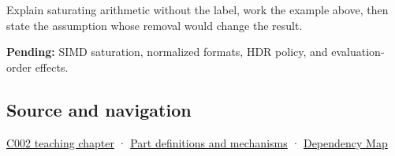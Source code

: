 Explain saturating arithmetic without the label, work the example above, then state the assumption whose removal would change the result.

\textbf{Pending:} SIMD saturation, normalized formats, HDR policy, and evaluation-order effects.

\subsection{Source and navigation}\label{appendix-3999c6209649-source-and-navigation}

\hyperref[01-foundations-i-ch001-arithmetic-becomes-a-policy]{C002 teaching chapter} · \hyperref[appendix-fd090d982a15]{Part definitions and mechanisms} · \hyperref[appendix-4ad47bdd269a]{Dependency Map}
